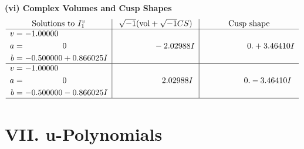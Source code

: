 \documentclass[1p]{elsarticle_modified}
\theoremstyle{definition}
\newcommand{\I}{\sqrt{-1}}
\begin{document}
\newpage\flushleft \textbf{(vi) Complex Volumes and Cusp Shapes}
$$\begin{array}{c|c|c}  
\text{Solutions to }I^v_{1}& \I (\text{vol} + \sqrt{-1}CS) & \text{Cusp shape}\\
 \hline 
\begin{aligned}
v &= -1.00000\phantom{ +0.000000I} \\
a &= \phantom{-0.000000 } 0 \\
b &= -0.500000 + 0.866025 I\end{aligned}
 & \phantom{-0.000000 } -2.02988 I & \phantom{-0.000000 -}0. + 3.46410 I \\ \hline\begin{aligned}
v &= -1.00000\phantom{ +0.000000I} \\
a &= \phantom{-0.000000 } 0 \\
b &= -0.500000 - 0.866025 I\end{aligned}
 & \phantom{-0.000000 -}2.02988 I & \phantom{-0.000000 } 0. - 3.46410 I\\
 \hline 
 \end{array}$$\newpage
\newpage\renewcommand{\arraystretch}{1}
\centering \section*{ VII. u-Polynomials}
\end{document}
